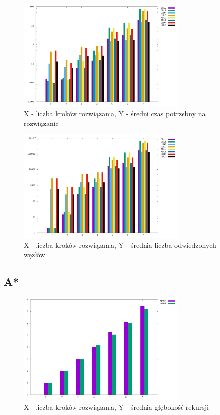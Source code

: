 \documentclass{classrep}
\begin{document}
{{            \begin{figure}[!htbp]
                \centering
                \includegraphics[width=\textwidth, height=55mm]{img/DFS_time.png}
                \caption{X - liczba kroków rozwiązania, Y - średni czas potrzebny na rozwiązanie}
                \label{DFS_time}
            \end{figure}

            \begin{figure}[!htbp]
                \centering
                \includegraphics[width=\textwidth, height=55mm]{img/DFS_visited.png}
                \caption{X - liczba kroków rozwiązania, Y - średnia liczba odwiedzonych węzłów}
                \label{DFS_visited}
            \end{figure}
            \FloatBarrier
        }

        \subsection{A*} {
            \begin{figure}[!htbp]
                \centering
                \includegraphics[width=\textwidth, height=55mm]{img/ASTR_depth.png}
                \caption{X - liczba kroków rozwiązania, Y - średnia głębokość rekursji}
                \label{ASTR_depth}
            \end{figure}

}}
\end{document}
